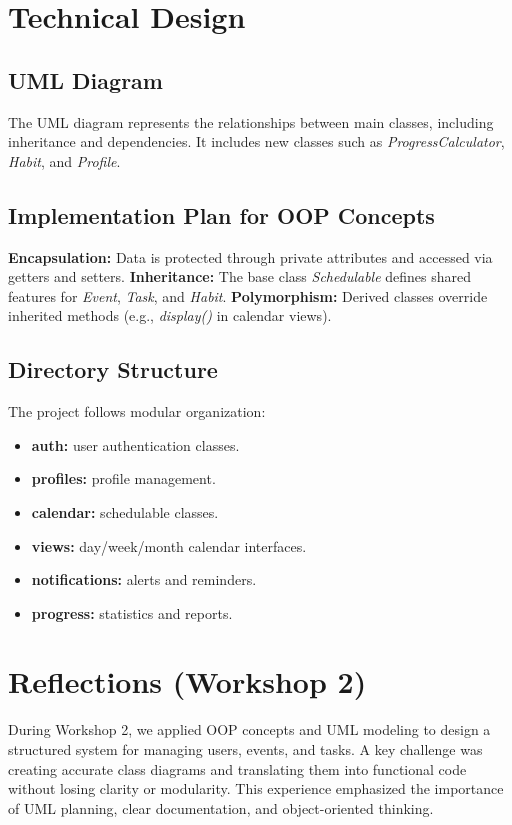 \documentclass[man]{apa7}
\begin{document}
\section{Technical Design}
\subsection{UML Diagram}
The UML diagram represents the relationships between main classes, including inheritance and dependencies. It includes new classes such as \textit{ProgressCalculator}, \textit{Habit}, and \textit{Profile}.

\subsection{Implementation Plan for OOP Concepts}
\textbf{Encapsulation:} Data is protected through private attributes and accessed via getters and setters.
\textbf{Inheritance:} The base class \textit{Schedulable} defines shared features for \textit{Event}, \textit{Task}, and \textit{Habit}.
\textbf{Polymorphism:} Derived classes override inherited methods (e.g., \textit{display()} in calendar views).

\subsection{Directory Structure}
The project follows modular organization:
\begin{itemize}
\item \textbf{auth:} user authentication classes.
\item \textbf{profiles:} profile management.
\item \textbf{calendar:} schedulable classes.
\item \textbf{views:} day/week/month calendar interfaces.
\item \textbf{notifications:} alerts and reminders.
\item \textbf{progress:} statistics and reports.
\end{itemize}

\section{Reflections (Workshop 2)}
During Workshop 2, we applied OOP concepts and UML modeling to design a structured system for managing users, events, and tasks. A key challenge was creating accurate class diagrams and translating them into functional code without losing clarity or modularity. This experience emphasized the importance of UML planning, clear documentation, and object-oriented thinking.
\end{document}
